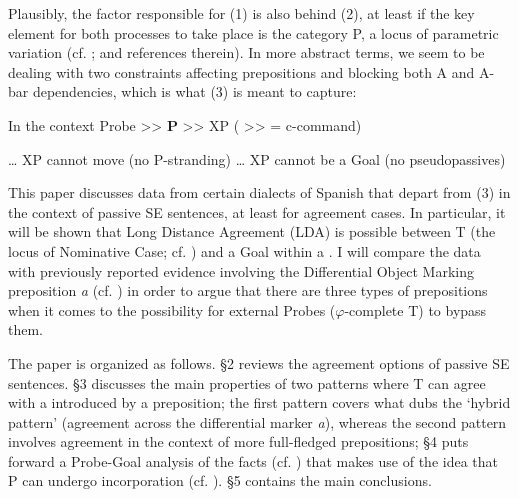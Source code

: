 \documentclass[output=paper]{langsci/langscibook}
\begin{document}
    \z
{}

Plausibly, the factor responsible for (1) is also behind (2), at least if the key element for both processes to take place is the category P, a locus of parametric variation (cf. \citealt{Hornstein1981,Kayne1984,Kayne1994,Kayne2005,Abels2003}; and references therein). In more abstract terms, we seem to be dealing with two constraints affecting prepositions and blocking both A and A-bar dependencies, which is what (3) is meant to capture:

\ea%
    \label{ex:gallego:3}
     In the context Probe >>  \textbf{P}  >>  XP  ( >> = c-command)\\
     \begin{xlisti}\setcounter{xnumii}{1}
     \ex \ldots\xspace XP cannot move (no P-stranding)
     \ex \ldots\xspace XP cannot be a Goal (no pseudopassives)
     \end{xlisti}
\z

This paper discusses data from certain dialects of Spanish that depart from (3) in the context of passive SE sentences, at least for agreement cases. In particular, it will be shown that Long Distance Agreement (LDA) is possible between T (the locus of Nominative Case; cf. \citealt{Chomsky2000,Chomsky2001Derivation}) and a \CATDP Goal within a \CATPP. I will compare the data with previously reported evidence involving the Differential Object Marking preposition \textit{a} (cf. \citealt{Torrego1998,López2012}) in order to argue that there are three types of prepositions when it comes to the possibility for external Probes ($\varphi $-complete T) to bypass them.

The paper is organized as follows. §2 reviews the agreement options of passive SE sentences. §3 discusses the main properties of two patterns where T can agree with a \CATDP introduced by a preposition; the first pattern covers what \citet{RAE-ASALE2009} dubs the ‘hybrid pattern’ (agreement across the differential marker \textit{a}), whereas the second pattern involves agreement in the context of more full-fledged prepositions; §4 puts forward a Probe-Goal analysis of the facts (cf. \citealt{Chomsky2000,Chomsky2001Derivation}) that makes use of the idea that P can undergo incorporation (cf. \citealt{Hornstein1981,Law2006}). §5 contains the main conclusions.
\end{document}
